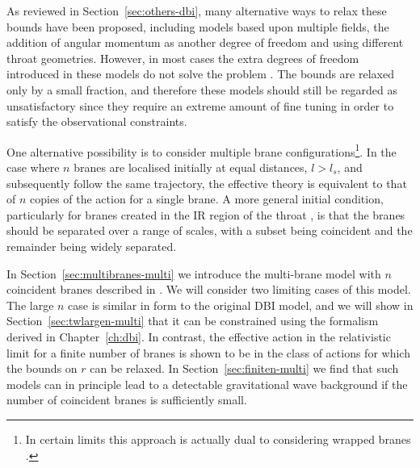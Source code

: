 As reviewed in Section~\ref{sec:others-dbi}, many alternative ways to relax these
bounds have been proposed, including
models based upon multiple fields, the addition of
angular momentum as another degree of freedom and using
different throat geometries. However, in most cases
the extra degrees of freedom introduced in these models do not solve the problem
\cite{Alabidi:2008ej}. The 
bounds are relaxed only by a small fraction, and therefore these models should still be 
regarded as unsatisfactory since they require an extreme amount of fine tuning in order
to satisfy the observational constraints.

One alternative possibility is to consider 
multiple brane configurations\footnote{In certain limits this approach 
is actually dual to considering wrapped branes \cite{Ward:2007gs}.}. 
In the case where  
$n$ branes are localised initially at equal distances, $l > l_s$, and 
subsequently follow the same trajectory, 
the effective theory is equivalent to that of $n$ copies of the
action for a single brane. A more general initial condition, particularly
for branes created in the IR region of the throat
\cite{brane13, DeWolfe:2004qx, Kachru:2002gs}, is that
the branes should be separated over a range of scales, 
with a subset being coincident and the remainder being widely separated. 


In Section~\ref{sec:multibranes-multi} we introduce the multi-brane
model with $n$ coincident branes described in . We will
consider two limiting cases of this model. The large $n$ case is similar in
form to the original DBI model, and we will show in
Section~\ref{sec:twlargen-multi} that it can be constrained using the
formalism derived in Chapter~\ref{ch:dbi}. In contrast, the effective action in the
relativistic limit for a finite number of
branes is shown to be in the
class of actions for which the bounds on $r$ can be relaxed.
In Section~\ref{sec:finiten-multi} we find that
such models 
can in principle lead to a detectable 
gravitational wave background if 
the number of coincident branes is sufficiently small. 





% 
% 
